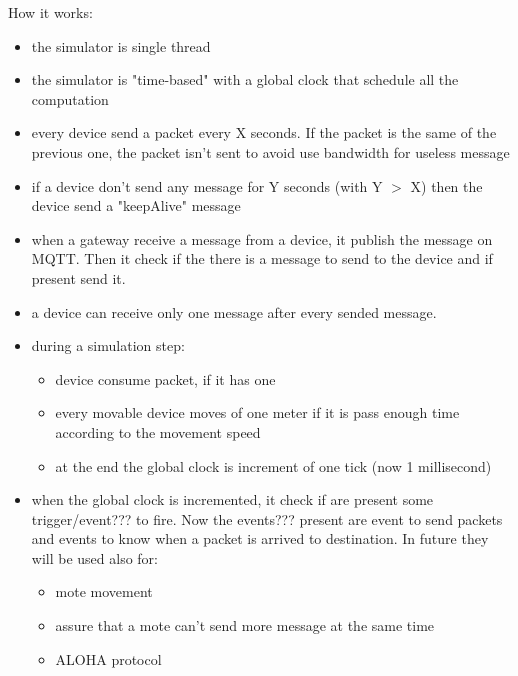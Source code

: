 How it works:
\begin{itemize}
    \item the simulator is single thread
    \item the simulator is "time-based" with a global clock that schedule all the computation
    \item every device send a packet every X seconds. If the packet is the same of the previous one, the packet isn't sent to avoid use bandwidth for useless message
    \item if a device don't send any message for Y seconds (with Y $>$ X) then the device send a "keepAlive" message
    \item when a gateway receive a message from a device, it publish the message on MQTT. Then it check if the there is a message to send to the device and if present send it.
    \item a device can receive only one message after every sended message.
    \item during a simulation step:
    \begin{itemize}
        \item device consume packet, if it has one
        \item every movable device moves of one meter if it is pass enough time according to the movement speed
        \item at the end the global clock is increment of one tick (now 1 millisecond)
    \end{itemize}
    \item when the global clock is incremented, it check if are present some trigger/event??? to fire. Now the events??? present are event to send packets and events to know when a packet is arrived to destination. In future they will be used also for:
    \begin{itemize}
        \item mote movement
        \item assure that a mote can't send more message at the same time
        \item ALOHA protocol
    \end{itemize}
\end{itemize}